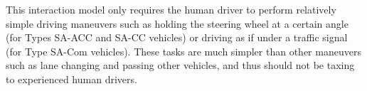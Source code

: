 This interaction model only requires the human driver to perform
relatively simple driving maneuvers such as holding the steering wheel
at a certain angle (for Types SA-ACC and SA-CC vehicles) or
driving as if under a traffic signal (for Type SA-Com vehicles).
These tasks are much simpler than other maneuvers such as lane
changing and passing other vehicles, and thus should not be taxing to experienced human drivers.  












